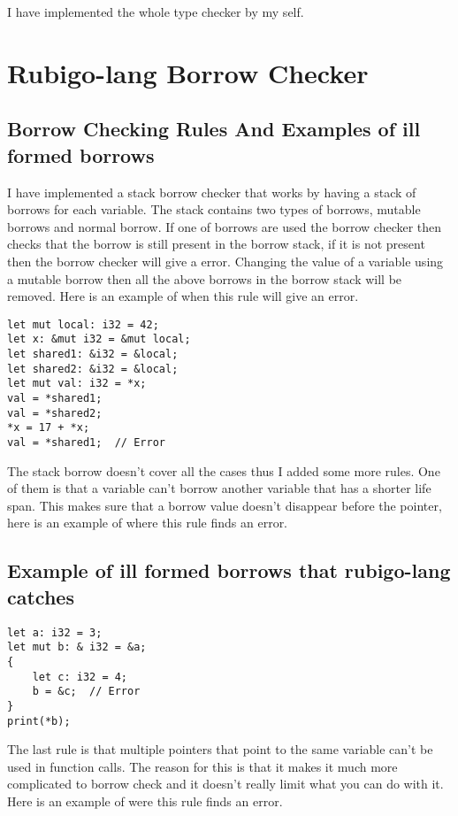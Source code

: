 \documentclass[12pt]{article}
\begin{document}
		I have implemented the whole type checker by my self.


    \section{Rubigo-lang Borrow Checker}	
    	\subsection{Borrow Checking Rules And Examples of ill formed borrows}
	I have implemented a stack borrow checker that works by having a stack of borrows for each variable. The stack contains two types of borrows, mutable borrows and normal borrow. If one of borrows are used the borrow checker then checks that the borrow is still present in the borrow stack, if it is not present then the borrow checker will give a error. Changing the value of a variable using a mutable borrow then all the above borrows in the borrow stack will be removed. Here is an example of when this rule will give an error.

    	\begin{verbatim}
let mut local: i32 = 42;
let x: &mut i32 = &mut local;
let shared1: &i32 = &local;
let shared2: &i32 = &local;
let mut val: i32 = *x;
val = *shared1;
val = *shared2;
*x = 17 + *x;
val = *shared1;  // Error
    	\end{verbatim}

	The stack borrow doesn't cover all the cases thus I added some more rules. One of them is that a variable can't borrow another variable that has a shorter life span. This makes sure that a borrow value doesn't disappear before the pointer, here is an example of where this rule finds an error.

	\subsection{Example of ill formed borrows that rubigo-lang catches}
    	\begin{verbatim}
let a: i32 = 3;
let mut b: & i32 = &a;
{
    let c: i32 = 4;
    b = &c;  // Error
}
print(*b);
    	\end{verbatim}

	The last rule is that multiple pointers that point to the same variable can't be used in function calls. The reason for this is that it makes it much more complicated to borrow check and it doesn't really limit what you can do with it. Here is an example of were this rule finds an error.
\end{document}
